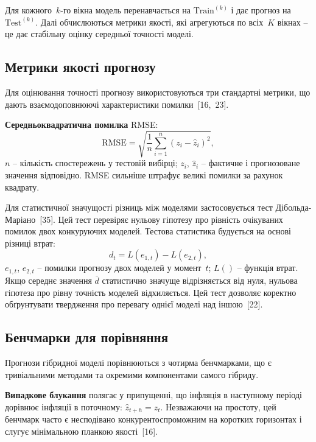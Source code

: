 \documentclass{bachelor_thesis}
\begin{document}
Для кожного~$k$-го вікна модель перенавчається на $\text{Train}^{(k)}$ і дає прогноз на $\text{Test}^{(k)}$. Далі обчислюються метрики якості, які агрегуються по всіх~$K$ вікнах -- це дає стабільну оцінку середньої точності моделі.

\subsection{Метрики якості прогнозу}

Для оцінювання точності прогнозу використовуються три стандартні метрики, що дають взаємодоповнюючі характеристики помилки~[16,~23].

\textbf{Середньоквадратична помилка} RMSE:
\begin{equation}\label{eq:rmse}
\text{RMSE} = \sqrt{\frac{1}{n} \sum_{i=1}^{n} (z_i - \hat{z}_i)^2},
\end{equation}
 $n$ -- кількість спостережень у тестовій вибірці; $z_i$, $\hat{z}_i$ -- фактичне і прогнозоване значення відповідно. RMSE сильніше штрафує великі помилки за рахунок квадрату.

Для статистичної значущості різниць між моделями застосовується тест Дібольда-Маріано~[35]. Цей тест перевіряє нульову гіпотезу про рівність очікуваних помилок двох конкуруючих моделей. Тестова статистика будується на основі різниці втрат:
\begin{equation}\label{eq:dm_test}
d_t = L(e_{1,t}) - L(e_{2,t}),
\end{equation}
 $e_{1,t}$, $e_{2,t}$ -- помилки прогнозу двох моделей у момент~$t$; $L()$ -- функція втрат. Якщо середнє значення $\bar{d}$ статистично значуще відрізняється від нуля, нульова гіпотеза про рівну точність моделей відхиляється. Цей тест дозволяє коректно обґрунтувати твердження про перевагу однієї моделі над іншою~[22].

\subsection{Бенчмарки для порівняння}

Прогнози гібридної моделі порівнюються з чотирма бенчмарками, що є тривіальними методами та окремими компонентами самого гібриду.

\textbf{Випадкове блукання} полягає у припущенні, що інфляція в наступному періоді дорівнює інфляції в поточному: $\hat{z}_{t+h} = z_t$. Незважаючи на простоту, цей бенчмарк часто є несподівано конкурентоспроможним на коротких горизонтах і слугує мінімальною планкою якості~[16].
\end{document}
